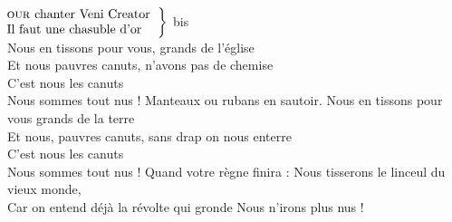 %
~\\
$\left.\begin{tabular}{l}
\hspace {-0.4cm}
\textsc{our} chanter Veni Creator
\\
\hspace{-0.4cm}
Il faut une chasuble d'or
\end{tabular}\right\rbrace$ bis
\\Nous en tissons pour vous, grands de l'église
\\Et nous pauvres canuts, n'avons pas de chemise
\\C'est nous les canuts
\\Nous sommes tout nus !
{Manteaux ou rubans en sautoir.}
Nous en tissons pour vous grands de la terre
\\Et nous, pauvres canuts, sans drap on nous enterre
\\C'est nous les canuts
\\Nous sommes tout nus !
{Quand votre règne finira :}
Nous tisserons le linceul du vieux monde,
\\Car on entend déjà la révolte qui gronde
{Nous n'irons plus nus !}

\breakpage